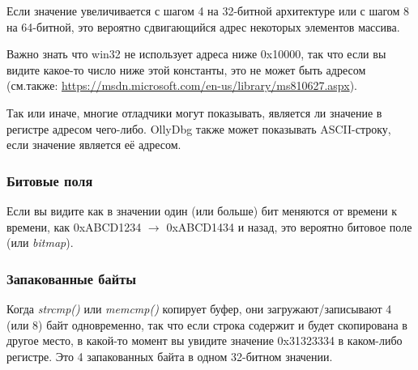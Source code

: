 Если значение увеличивается с шагом 4 на 32-битной архитектуре или с шагом 8 на 64-битной,
это вероятно сдвигающийся адрес некоторых элементов массива.

Важно знать что win32 не использует адреса ниже 0x10000, так что если вы видите какое-то число ниже этой константы,
это не может быть адресом (см.также: \url{https://msdn.microsoft.com/en-us/library/ms810627.aspx}).

Так или иначе, многие отладчики могут показывать, является ли значение в регистре адресом чего-либо.
OllyDbg также может показывать ASCII-строку, если значение является её адресом.

\subsubsection{Битовые поля}

Если вы видите как в значении один (или больше) бит меняются от времени к времени, как 0xABCD1234 $\rightarrow$ 0xABCD1434 и назад,
это вероятно битовое поле (или \emph{bitmap}).

\subsubsection{Запакованные байты}

Когда \emph{strcmp()} или \emph{memcmp()} копирует буфер, они загружают/записывают 4 (или 8) байт одновременно,
так что если строка содержит  и будет скопирована в другое место,
в какой-то момент вы увидите значение 0x31323334 в каком-либо регистре.
Это 4 запакованных байта в одном 32-битном значении.

